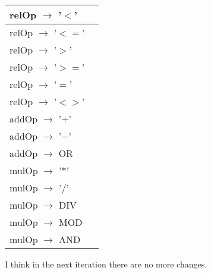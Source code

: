 \documentclass[8pt]{scrartcl}
\begin{document}
\begin{itemize}
\begin{tabular}{|l|l|}
                    \hline
                    relOp $\rightarrow$ '$<$' & \\
                    \hline
                    relOp $\rightarrow$ '$<=$' & \\
                    \hline
                    relOp $\rightarrow$ '$>$' & \\
                    \hline
                    relOp $\rightarrow$ '$>=$' & \\
                    \hline
                    relOp $\rightarrow$ '$=$' & \\
                    \hline
                    relOp $\rightarrow$ '$<>$' & \\
                    \hline
                    addOp $\rightarrow$ '$+$' & \\
                    \hline
                    addOp $\rightarrow$ '$-$' & \\
                    \hline
                    addOp $\rightarrow$ OR & \\
                    \hline
                    mulOp $\rightarrow$ '$*$' & \\
                    \hline
                    mulOp $\rightarrow$ '$/$' & \\
                    \hline
                    mulOp $\rightarrow$ DIV & \\
                    \hline
                    mulOp $\rightarrow$ MOD & \\
                    \hline
                    mulOp $\rightarrow$ AND & \\
                    \hline
                \end{tabular}
        \end{itemize}
        I think in the next iteration there are no more changes.
\end{document}
